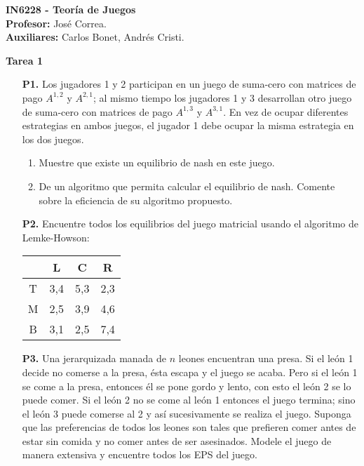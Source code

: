 \documentclass[11pt, spanish]{article}
\theoremstyle{plain}
\begin{document}

\begin{flushleft}
  \textbf{IN6228 - Teor\'ia de Juegos}
  \\\textbf{Profesor:} Jos\'e Correa.
  \\\textbf{Auxiliares:} Carlos Bonet, Andr\'es Cristi.
\end{flushleft}


\begin{center}
  \Large{\textbf{Tarea 1}}
\end{center}




\begin{itemize}
  \item[\textbf{P1.}] Los jugadores 1 y 2 participan en un juego de suma-cero con matrices de pago $A^{1,2}$ y $A^{2,1}$; al mismo tiempo los jugadores 1 y 3 desarrollan otro juego de suma-cero con matrices de pago $A^{1,3}$ y $A^{3,1}$. En vez de ocupar diferentes estrategias en ambos juegos, el jugador 1 debe ocupar la misma estrategia en los dos juegos.
  \begin{enumerate}
    \item Muestre que existe un equilibrio de nash en este juego.
    \item De un algoritmo que permita calcular el equilibrio de nash. Comente sobre la eficiencia de su algoritmo propuesto.
  \end{enumerate}

  \item[\textbf{P2.}] Encuentre todos los equilibrios del juego matricial usando el algoritmo de Lemke-Howson:

     \begin{center}
      \begin{tabular}{|c|c|c|c|}
          \hline
            &L & C & R\\
          \hline\hline
          T&3,4& 5,3 & 2,3\\
          M& 2,5& 3,9& 4,6\\
          B& 3,1 & 2,5& 7,4\\
          \hline
      \end{tabular}
      \end{center}

  \item[\textbf{P3.}] Una jerarquizada manada de $n$ leones encuentran una presa. Si el le\'on 1 decide no comerse a la presa, \'esta escapa y el juego se acaba. Pero si el le\'on 1 se come a la presa, entonces \'el se pone gordo y lento, con esto el le\'on 2 se lo puede comer. Si el le\'on 2 no se come al le\'on 1 entonces el juego termina; sino el le\'on 3 puede comerse al 2 y as\'i sucesivamente se realiza el juego. Suponga que las preferencias de todos los leones son tales que prefieren comer antes de estar sin comida y no comer antes de ser asesinados. Modele el juego de manera extensiva y encuentre todos los EPS del juego.


\end{itemize}
\end{document}
